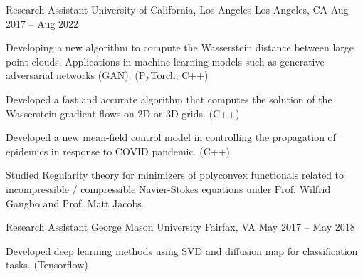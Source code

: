 

\begin{cventries}

  \cventry
    {Research Assistant} %
    {University of California, Los Angeles} %
    {Los Angeles, CA} %
    {Aug 2017 – Aug 2022} %
    {
      \begin{cvitems} %
        \item Developing a new algorithm to compute the Wasserstein distance between large point clouds. Applications in machine learning models such as generative adversarial networks (GAN). {\footnotesize (PyTorch, C++)}
          \item Developed a fast and accurate algorithm that computes the  solution of the Wasserstein gradient flows on 2D or 3D grids. {\footnotesize (C++)}
          \item Developed a new mean-field control model in controlling the propagation of epidemics in response to COVID pandemic. {\footnotesize (C++)}
          \item Studied Regularity theory for minimizers of polyconvex functionals related to incompressible / compressible Navier-Stokes equations under Prof. Wilfrid Gangbo and Prof. Matt Jacobs.
      \end{cvitems}
    }

  \cventry
    {Research Assistant} %
    {George Mason University} %
    {Fairfax, VA} %
    {May 2017 – May 2018} %
    {
      \begin{cvitems} %
        \item Developed deep learning methods using SVD and diffusion map for classification tasks. {\footnotesize (Tensorflow)}
      \end{cvitems}
    }


\end{cventries}
